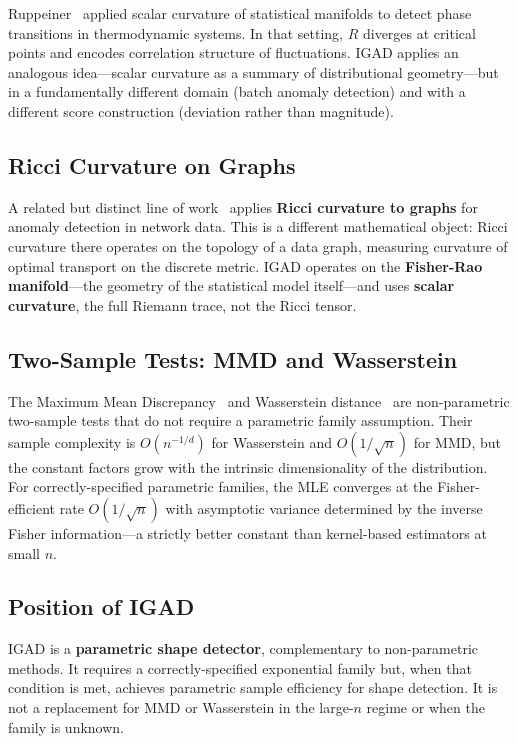\documentclass[12pt]{article}
\begin{document}
Ruppeiner~\cite{ruppeiner1979,ruppeiner1995} applied scalar curvature of
statistical manifolds to detect phase transitions in thermodynamic systems. In
that setting, $R$ diverges at critical points and encodes correlation structure
of fluctuations. IGAD applies an analogous idea---scalar curvature as a summary
of distributional geometry---but in a fundamentally different domain (batch
anomaly detection) and with a different score construction (deviation rather
than magnitude).

\subsection{Ricci Curvature on Graphs}

A related but distinct line of work~\cite{ollivier2009,lin2011} applies
\textbf{Ricci curvature to graphs} for anomaly detection in network data. This
is a different mathematical object: Ricci curvature there operates on the
topology of a data graph, measuring curvature of optimal transport on the
discrete metric. IGAD operates on the \textbf{Fisher-Rao manifold}---the
geometry of the statistical model itself---and uses \textbf{scalar curvature},
the full Riemann trace, not the Ricci tensor.

\subsection{Two-Sample Tests: MMD and Wasserstein}

The Maximum Mean Discrepancy~\cite{gretton2012} and Wasserstein
distance~\cite{villani2008} are non-parametric two-sample tests that do not
require a parametric family assumption. Their sample complexity is
$O(n^{-1/d})$ for Wasserstein and $O(1/\sqrt{n})$ for MMD, but the constant
factors grow with the intrinsic dimensionality of the distribution. For
correctly-specified parametric families, the MLE converges at the
Fisher-efficient rate $O(1/\sqrt{n})$ with asymptotic variance determined by
the inverse Fisher information---a strictly better constant than kernel-based
estimators at small $n$.

\subsection{Position of IGAD}

IGAD is a \textbf{parametric shape detector}, complementary to non-parametric
methods. It requires a correctly-specified exponential family but, when that
condition is met, achieves parametric sample efficiency for shape detection. It
is not a replacement for MMD or Wasserstein in the large-$n$ regime or when the
family is unknown.
\end{document}
